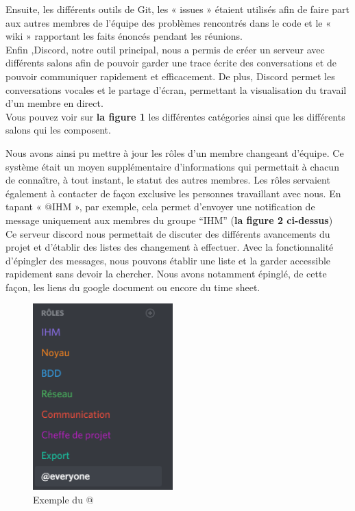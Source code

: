 \documentclass[a4paper,11pt]{article}
\begin{document}
Ensuite, les différents outils de Git, les « issues » étaient utilisés afin de faire part aux autres membres de l’équipe des problèmes rencontrés dans le code et le « wiki »  rapportant les faits énoncés pendant les réunions. \\




Enfin ,Discord, notre outil principal, nous a permis de créer un serveur avec différents salons afin de pouvoir garder une trace écrite des conversations et de pouvoir communiquer rapidement et efficacement. De plus, Discord permet les conversations vocales et le partage d’écran, permettant la visualisation du travail d’un membre en direct. \\



Vous pouvez voir sur \textbf{la figure 1} les différentes catégories ainsi que les différents salons qui les composent. \\

\newpage

Nous avons ainsi pu mettre à jour les rôles d’un membre changeant d’équipe. Ce système était un moyen supplémentaire d’informations qui permettait à chacun de connaître, à tout instant, le statut des autres membres. Les rôles servaient également à contacter de façon exclusive les personnes travaillant avec nous.  En tapant « @IHM », par exemple, cela permet d’envoyer une notification de message uniquement aux membres du groupe “IHM” (\textbf{la figure 2 ci-dessus}) \\

Ce serveur discord nous permettait de discuter des différents avancements du projet et d’établir des listes des changement à effectuer. Avec la fonctionnalité d’épingler des messages, nous pouvons établir une liste et la garder accessible rapidement sans devoir la chercher. Nous avons notamment épinglé, de cette façon, les liens du google document ou encore du time sheet. \\


\begin{figure}
	\begin{center}
	\includegraphics[width=0.48\textwidth]{Img/image5.png}
	\end{center}
	\caption{Exemple du @}	
\end{figure}
\end{document}
